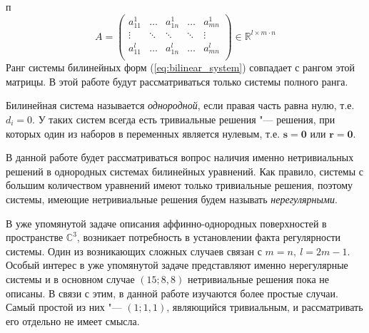 \documentclass[10pt]{article}
\begin{document}
п
$$
	A = 
	\begin{pmatrix}
	a^{1}_{11} & \hdots  & a^{1}_{1n}  & \hdots &  a^{1}_{mn} \\ 
	\vdots & \ddots  & \ddots & \ddots  & \vdots \\
	a^{l}_{11} & \hdots  & a^{l}_{1n}  & \hdots  & a^{l}_{mn} \\ 
	\end{pmatrix} \in \mathbb{R}^{l \times m \cdot n}
$$ 
Ранг системы билинейных форм (\ref{eq:bilinear_system}) совпадает с рангом этой матрицы. В этой работе будут рассматриваться только системы полного ранга.

Билинейная система называется \textit{однородной}, если правая часть равна нулю, т.е. $d_i 
= 0$. У таких систем всегда есть тривиальные решения "--- решения, при которых один из 
наборов в переменных является нулевым, т.е. $\mathbf{s} = \mathbf{0}$ или $\mathbf{r} = 
\mathbf{0}$.

В данной работе будет рассматриваться вопрос наличия именно нетривиальных решений в 
однородных системах билинейных уравнений. Как правило, системы с большим количеством уравнений имеют только тривиальные решения, поэтому системы, имеющие нетривиальные решения будем называть \textit{нерегулярными}.

В уже упомянутой задаче описания аффинно-однородных поверхностей в пространстве $ \mathbb{C}^3 $, возникает потребность в установлении факта регулярности системы. Один из возникающих 
сложных случаев связан с 
$
	m = n,~l = 2m - 1.
$
Особый интерес в уже упомянутой задаче представляют именно нерегулярные системы и в основном случае $(15; 8, 8)$ нетривиальные решения пока не описаны. В связи с этим, в данной работе изучаются более простые случаи. Самый простой из них "--- $(1; 1, 1)$, являющийся тривиальным, и рассматривать его отдельно не имеет смысла.
\end{document}
